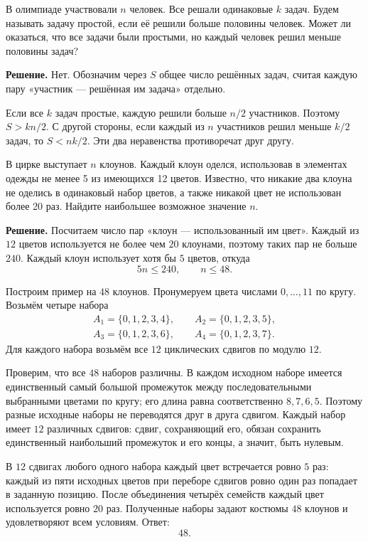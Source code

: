 \begin{problems}
\item В олимпиаде участвовали $n$ человек. Все решали одинаковые $k$ задач. Будем называть задачу простой, если её решили больше половины человек. Может ли оказаться, что все задачи были простыми, но каждый человек решил меньше половины задач?
\par\smallskip\noindent\textbf{Решение.} Нет. Обозначим через $S$ общее число решённых задач, считая каждую пару «участник --- решённая им задача» отдельно.
\par Если все $k$ задач простые, каждую решили больше $n/2$ участников. Поэтому $S>kn/2$. С другой стороны, если каждый из $n$ участников решил меньше $k/2$ задач, то $S<nk/2$. Эти два неравенства противоречат друг другу.\par

\item В цирке выступает $n$ клоунов. Каждый клоун оделся, использовав в элементах одежды не менее 5 из имеющихся 12 цветов. Известно, что никакие два клоуна не оделись в одинаковый набор цветов, а также никакой цвет не использован более 20 раз. Найдите наибольшее возможное значение $n$.
\par\smallskip\noindent\textbf{Решение.} Посчитаем число пар «клоун --- использованный им цвет». Каждый из $12$ цветов используется не более чем $20$ клоунами, поэтому таких пар не больше $240$. Каждый клоун использует хотя бы $5$ цветов, откуда
\[
5n\le240,\qquad n\le48.
\]
\par Построим пример на $48$ клоунов. Пронумеруем цвета числами $0,\ldots,11$ по кругу. Возьмём четыре набора
\[
\begin{gathered}
A_1=\{0,1,2,3,4\},\qquad A_2=\{0,1,2,3,5\},\\
A_3=\{0,1,2,3,6\},\qquad A_4=\{0,1,2,3,7\}.
\end{gathered}
\]
Для каждого набора возьмём все $12$ циклических сдвигов по модулю $12$.
\par Проверим, что все $48$ наборов различны. В каждом исходном наборе имеется единственный самый большой промежуток между последовательными выбранными цветами по кругу; его длина равна соответственно $8,7,6,5$. Поэтому разные исходные наборы не переводятся друг в друга сдвигом. Каждый набор имеет $12$ различных сдвигов: сдвиг, сохраняющий его, обязан сохранить единственный наибольший промежуток и его концы, а значит, быть нулевым.
\par В $12$ сдвигах любого одного набора каждый цвет встречается ровно $5$ раз: каждый из пяти исходных цветов при переборе сдвигов ровно один раз попадает в заданную позицию. После объединения четырёх семейств каждый цвет используется ровно $20$ раз. Полученные наборы задают костюмы $48$ клоунов и удовлетворяют всем условиям. Ответ:
\[
\boxed{48}.
\]\par


\end{problems}

